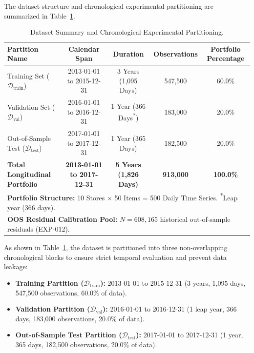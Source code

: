 \documentclass[11pt,a4paper]{article}
\begin{document}
The dataset structure and chronological experimental partitioning are summarized in Table~\ref{tab:partitions}.

\begin{table}[htbp]
\centering
\small
\caption{Dataset Summary and Chronological Experimental Partitioning.}
\label{tab:partitions}
\begin{tabular}{lcccc}
\toprule
\textbf{Partition Name} & \textbf{Calendar Span} & \textbf{Duration} & \textbf{Observations} & \textbf{Portfolio Percentage} \\
\midrule
Training Set ($\mathcal{D}_{\text{train}}$) & 2013-01-01 to 2015-12-31 & 3 Years (1,095 Days) & 547,500 & 60.0\% \\
Validation Set ($\mathcal{D}_{\text{val}}$) & 2016-01-01 to 2016-12-31 & 1 Year (366 Days\textsuperscript{*}) & 183,000 & 20.0\% \\
Out-of-Sample Test ($\mathcal{D}_{\text{test}}$) & 2017-01-01 to 2017-12-31 & 1 Year (365 Days) & 182,500 & 20.0\% \\
\midrule
\textbf{Total Longitudinal Portfolio} & \textbf{2013-01-01 to 2017-12-31} & \textbf{5 Years (1,826 Days)} & \textbf{913,000} & \textbf{100.0\%} \\
\midrule
\multicolumn{5}{l}{\textbf{Portfolio Structure:} 10 Stores $\times$ 50 Items = 500 Daily Time Series. \textsuperscript{*}Leap year (366 days).} \\
\multicolumn{5}{l}{\textbf{OOS Residual Calibration Pool:} $N = 608,165$ historical out-of-sample residuals (EXP-012).} \\
\bottomrule
\end{tabular}
\end{table}

As shown in Table~\ref{tab:partitions}, the dataset is partitioned into three non-overlapping chronological blocks to ensure strict temporal evaluation and prevent data leakage:
\begin{itemize}
    \item \textbf{Training Partition ($\mathcal{D}_{\text{train}}$):} 2013-01-01 to 2015-12-31 (3 years, 1,095 days, 547,500 observations, 60.0\% of data).
    \item \textbf{Validation Partition ($\mathcal{D}_{\text{val}}$):} 2016-01-01 to 2016-12-31 (1 leap year, 366 days, 183,000 observations, 20.0\% of data).
    \item \textbf{Out-of-Sample Test Partition ($\mathcal{D}_{\text{test}}$):} 2017-01-01 to 2017-12-31 (1 year, 365 days, 182,500 observations, 20.0\% of data).
\end{itemize}
\end{document}
